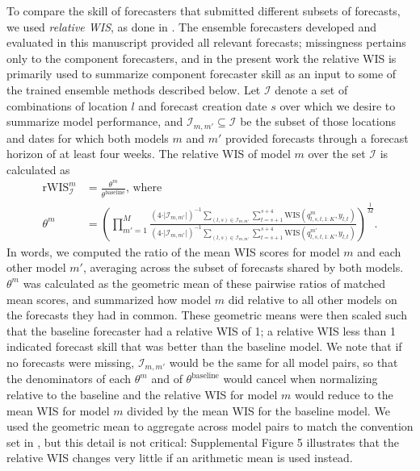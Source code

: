 \documentclass[11pt,3p,authoryear]{elsarticle}
\def\WIS{\mathrm{WIS}}
\def\rWIS{\mathrm{rWIS}}
\begin{document}
To compare the skill of forecasters that submitted different subsets of forecasts, we used \emph{relative WIS}, as done in \cite{cramerEvaluationIndividualEnsemble2022}.
The ensemble forecasters developed and evaluated in this manuscript provided all relevant forecasts; missingness pertains only to the component forecasters, and in the present work the relative WIS is primarily used to summarize component forecaster skill as an input to some of the trained ensemble methods described below.
Let $\mathcal{I}$ denote a set of combinations of location $l$ and forecast creation date $s$ over which we desire to summarize model performance, and $\mathcal{I}_{m, m'} \subseteq \mathcal{I}$ be the subset of those locations and dates for which both models $m$ and $m'$ provided forecasts through a forecast horizon of at least four weeks. The relative WIS of model $m$ over the set $\mathcal{I}$ is calculated as
\begin{align*}
\rWIS^{m}_{\mathcal{I}} &= \frac{\theta^m}{\theta^{\text{baseline}}} \text{, where } \\
\theta^m &= \left(\prod_{m'=1}^M \frac{(4 \cdot \vert \mathcal{I}_{m, m'} \vert)^{-1} \sum_{(l, s) \in \mathcal{I}_{m, m'}} \sum_{t=s+1}^{s+4} \WIS(q^m_{l,s,t,1:K},y_{l,t}) }{ (4 \cdot \vert \mathcal{I}_{m, m'} \vert)^{-1} \sum_{(l, s) \in \mathcal{I}_{m, m'}} \sum_{t=s+1}^{s+4} \WIS(q^{m'}_{l,s,t,1:K},y_{l,t})} \right)^{\frac{1}{M}}.
\end{align*}
In words, we computed the ratio of the mean WIS scores for model $m$ and each other model $m'$, averaging across the subset of forecasts shared by both models. $\theta^m$ was calculated as the geometric mean of these pairwise ratios of matched mean scores, and summarized how model $m$ did relative to all other models on the forecasts they had in common. These geometric means were then scaled such that the baseline forecaster had a relative WIS of 1; a relative WIS less than 1 indicated forecast skill that was better than the baseline model.
We note that if no forecasts were missing, $\mathcal{I}_{m, m'}$ would be the same for all model pairs, so that the denominators of each $\theta^m$ and of $\theta^{\text{baseline}}$ would cancel when normalizing relative to the baseline and the relative WIS for model $m$ would reduce to the mean WIS for model $m$ divided by the mean WIS for the baseline model.
We used the geometric mean to aggregate across model pairs to match the convention set in \cite{cramerEvaluationIndividualEnsemble2022}, but this detail is not critical: Supplemental Figure 5 illustrates that the relative WIS changes very little if an arithmetic mean is used instead.
\end{document}
